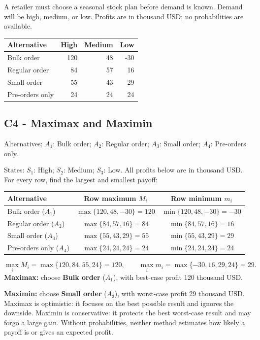 \clearpage
{}
A retailer must choose a seasonal stock plan before demand is known. Demand will be high, medium, or low. Profits are in thousand USD; no probabilities are available.
\begin{center}\small\setlength{\tabcolsep}{4pt}
\begin{tabular}{@{}lrrr@{}}\toprule
Alternative&High&Medium&Low\\\midrule
Bulk order&120&48&-30\\
Regular order&84&57&16\\
Small order&55&43&29\\
Pre-orders only&24&24&24\\\bottomrule
\end{tabular}\end{center}
\subsection*{C4 - Maximax and Maximin }
\label{sol:sportswear-stock-c4}
Alternatives: $A_1$: Bulk order; $A_2$: Regular order; $A_3$: Small order; $A_4$: Pre-orders only.\par
States: $S_1$: High; $S_2$: Medium; $S_3$: Low.
All profits below are in thousand USD. For every row, find the largest and smallest payoff:
\begin{center}
\begin{tabular}{@{}lcc@{}}\toprule
Alternative & Row maximum $M_i$ & Row minimum $m_i$\\\midrule
Bulk order ($A_1$) & $\max\{120,48,-30\}=120$ & $\min\{120,48,-30\}=-30$\\
Regular order ($A_2$) & $\max\{84,57,16\}=84$ & $\min\{84,57,16\}=16$\\
Small order ($A_3$) & $\max\{55,43,29\}=55$ & $\min\{55,43,29\}=29$\\
Pre-orders only ($A_4$) & $\max\{24,24,24\}=24$ & $\min\{24,24,24\}=24$\\
\bottomrule\end{tabular}
\end{center}
\[\max_i M_i=\max\{120,84,55,24\}=120,\qquad \max_i m_i=\max\{-30,16,29,24\}=29.\]
\textbf{Maximax:} choose \textbf{Bulk order} ($A_1$), with best-case profit 120 thousand USD.\par
\textbf{Maximin:} choose \textbf{Small order} ($A_3$), with worst-case profit 29 thousand USD.
Maximax is optimistic: it focuses on the best possible result and ignores the downside. Maximin is conservative: it protects the best worst-case result and may forgo a large gain. Without probabilities, neither method estimates how likely a payoff is or gives an expected profit.

